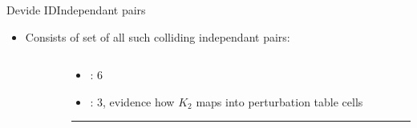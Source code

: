 \documentclass[aspectratio=169, hyperref={colorlinks=true, allcolors=SecondaryColor}, c]{beamer}
\begin{document}
	\begin{frame}[fragile]{Devide ID}{Independant pairs}
		\begin{itemize}
			\item Consists of set of all such colliding \alert{independant} pairs:
		\end{itemize}
		\vspace{0.5cm}
		\begin{columns}
			\begin{column}{0.6\textwidth}
				\begin{adjustbox}{max width=\textwidth}
				\end{adjustbox}
			\end{column}
			\begin{column}{0.4\textwidth}
				\begin{itemize}
					\item {}: 6
					\item {}: 3, evidence how $K_2$ maps into \alert{perturbation table} cells%
				\end{itemize}

				\begin{center}
					\vspace{-0.1cm}
					\color{PrimaryColor}\rule{0.9\textwidth}{0.25mm}
				\end{center}


\end{column}
\end{columns}
\end{frame}
\end{document}

